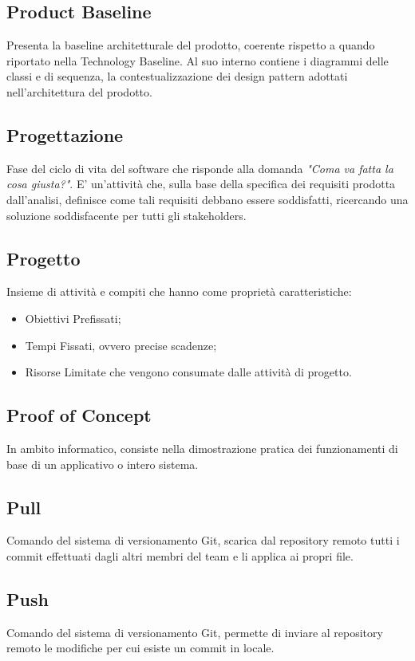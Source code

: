 \subsection{Product Baseline}
Presenta la baseline architetturale del prodotto, coerente rispetto a quando riportato nella Technology Baseline. Al suo interno contiene i diagrammi delle classi e di sequenza, la contestualizzazione dei design pattern adottati nell'architettura del prodotto.

\subsection{Progettazione}
Fase del ciclo di vita del software che risponde alla domanda \textit{"Coma va fatta la cosa giusta?"}. E' un'attività che, sulla base della specifica dei requisiti prodotta dall'analisi, definisce come tali requisiti debbano essere soddisfatti, ricercando una soluzione soddisfacente per tutti gli stakeholders.

\subsection{Progetto}
Insieme di attività e compiti che hanno come proprietà caratteristiche:
\begin{itemize}
	\item Obiettivi Prefissati;
	\item Tempi Fissati, ovvero precise scadenze;
	\item Risorse Limitate che vengono consumate dalle attività di progetto.
\end{itemize}

\subsection{Proof of Concept}
In ambito informatico, consiste nella dimostrazione pratica dei funzionamenti di base di un applicativo o intero sistema.

\subsection{Pull}
Comando del sistema di versionamento Git, scarica dal repository remoto tutti i commit effettuati dagli altri membri del team e li applica ai propri file.

\subsection{Push}
Comando del sistema di versionamento Git, permette di inviare al repository remoto le modifiche per cui esiste un commit in locale.